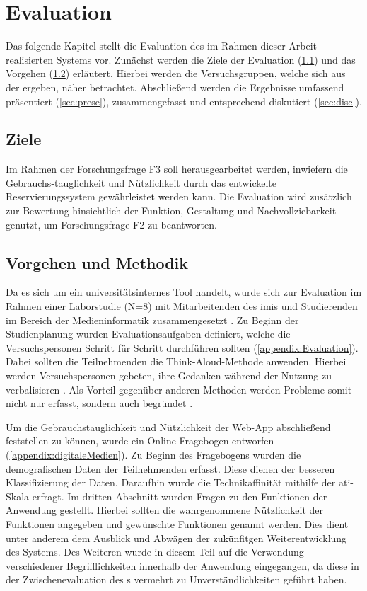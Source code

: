 

\chapter{Evaluation}
\label{chapter-evaluation}
Das folgende Kapitel stellt die Evaluation des im Rahmen dieser Arbeit realisierten Systems vor.
Zunächst werden die Ziele der Evaluation (\ref{sec:zieleev}) und das Vorgehen (\ref{sec:vorgeen})
erläutert. Hierbei werden die Versuchsgruppen, welche sich aus der 
ergeben, näher betrachtet. Abschließend werden die Ergebnisse umfassend präsentiert (\ref{sec:prese}), zusammengefasst
und entsprechend diskutiert (\ref{sec:disc}).

\section{Ziele}
\label{sec:zieleev}
Im Rahmen der Forschungsfrage F3 soll herausgearbeitet werden, inwiefern die
Gebrauchs-tauglichkeit und Nützlichkeit durch das entwickelte Reservierungssystem
gewährleistet werden kann. Die Evaluation wird zusätzlich zur Bewertung
hinsichtlich der Funktion, Gestaltung und Nachvollziebarkeit genutzt, um
Forschungsfrage F2 zu beantworten.


\section{Vorgehen und Methodik}
\label{sec:vorgeen}
Da es sich um ein universitätsinternes Tool handelt, wurde sich zur Evaluation im Rahmen einer
Laborstudie (N=8) mit Mitarbeitenden des \ac{imis} und Studierenden im Bereich der Medieninformatik
zusammengesetzt \cite{jandl_paper_2015}. Zu Beginn der Studienplanung wurden Evaluationsaufgaben
definiert, welche die Versuchspersonen Schritt für Schritt durchführen sollten
(\ref{appendix:Evaluation}). Dabei sollten die Teilnehmenden die Think-Aloud-Methode anwenden.
Hierbei werden Versuchspersonen gebeten, ihre Gedanken während der Nutzung zu verbalisieren
\cite{nielsen_usability_1994}. Als Vorteil gegenüber anderen Methoden werden Probleme somit nicht
nur erfasst, sondern auch begründet \cite{nielsen_usability_1994}.

Um die Gebrauchstauglichkeit und Nützlichkeit der Web-App abschließend feststellen zu können, wurde
ein Online-Fragebogen entworfen (\ref{appendix:digitaleMedien}). Zu Beginn des Fragebogens wurden
die demografischen Daten der Teilnehmenden erfasst. Diese dienen der besseren Klassifizierung der
Daten. Daraufhin wurde die Technikaffinität mithilfe der \ac{ati}-Skala erfragt. Im dritten
Abschnitt wurden Fragen zu den Funktionen der Anwendung gestellt. Hierbei sollten die wahrgenommene
Nützlichkeit der Funktionen angegeben und gewünschte Funktionen genannt werden. Dies dient unter
anderem dem Ausblick und Abwägen der zukünfitgen Weiterentwicklung des Systems. Des Weiteren wurde
in diesem Teil auf die Verwendung verschiedener Begrifflichkeiten innerhalb der Anwendung
eingegangen, da diese in der Zwischenevaluation des s vermehrt zu
Unverständlichkeiten geführt haben.

